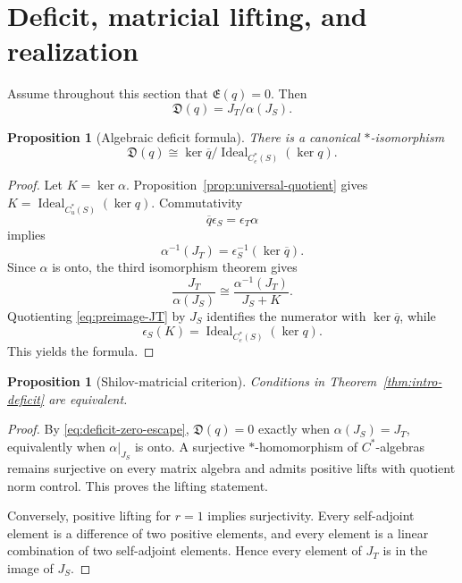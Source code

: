 \documentclass[11pt,a4paper]{amsart}
\theoremstyle{plain}
\newtheorem{proposition}[theorem]{Proposition}
\theoremstyle{definition}
\newcommand{\Cu}{C_u^*}
\newcommand{\Ce}{C_e^*}
\newcommand{\Esc}{\mathfrak E}
\newcommand{\Def}{\mathfrak D}
\newcommand{\Ideal}{\operatorname{Ideal}}
\begin{document}
\section{Deficit, matricial lifting, and realization}\label{sec:deficit}

Assume throughout this section that $\Esc(q)=0$.  Then
\begin{equation}\label{eq:deficit-zero-escape}
 \Def(q)=J_T/\alpha(J_S).
\end{equation}

\begin{proposition}[Algebraic deficit formula]\label{prop:deficit-formula}
There is a canonical $*$-isomorphism
\[
 \Def(q)\cong
 \ker\overline q\big/\Ideal_{\Ce(S)}(\ker q).
\]
\end{proposition}

\begin{proof}
Let $K=\ker\alpha$.  Proposition~\ref{prop:universal-quotient} gives
$K=\Ideal_{\Cu(S)}(\ker q)$.  Commutativity
\[
 \overline q\epsilon_S=\epsilon_T\alpha
\]
implies
\begin{equation}\label{eq:preimage-JT}
 \alpha^{-1}(J_T)=\epsilon_S^{-1}(\ker\overline q).
\end{equation}
Since $\alpha$ is onto, the third isomorphism theorem gives
\[
 \frac{J_T}{\alpha(J_S)}
 \cong\frac{\alpha^{-1}(J_T)}{J_S+K}.
\]
Quotienting \eqref{eq:preimage-JT} by $J_S$ identifies the numerator with
$\ker\overline q$, while
\[
 \epsilon_S(K)=\Ideal_{\Ce(S)}(\ker q).
\]
This yields the formula.
\end{proof}

\begin{proposition}[Shilov-matricial criterion]\label{prop:matricial}
Conditions in Theorem~\ref{thm:intro-deficit} are equivalent.
\end{proposition}

\begin{proof}
By \eqref{eq:deficit-zero-escape}, $\Def(q)=0$ exactly when
$\alpha(J_S)=J_T$, equivalently when $\alpha|_{J_S}$ is onto.  A surjective $*$-homomorphism of
$C^*$-algebras remains surjective on every matrix algebra and admits positive lifts with quotient
norm control.  This proves the lifting statement.

Conversely, positive lifting for $r=1$ implies surjectivity.  Every self-adjoint element is a
difference of two positive elements, and every element is a linear combination of two
self-adjoint elements.  Hence every element of $J_T$ is in the image of $J_S$.
\end{proof}
\end{document}
